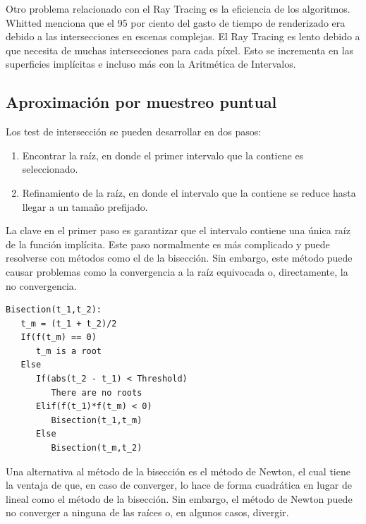 Otro problema relacionado con el Ray Tracing  es la eficiencia de los algoritmos. Whitted\cite{Whitted80} menciona que el 95 por ciento del gasto de tiempo de renderizado era debido a las intersecciones en escenas complejas. El Ray Tracing es lento debido a que necesita de muchas intersecciones para cada píxel. Esto se incrementa en las superficies implícitas e incluso más con la Aritmética de Intervalos.

\subsection{Aproximación por muestreo puntual}

Los test de intersección se pueden desarrollar en dos pasos:
\begin{enumerate}
\item Encontrar la raíz, en donde el primer intervalo que la contiene es seleccionado.
\item Refinamiento de la raíz, en donde el intervalo que la contiene se reduce hasta llegar a un tamaño prefijado.
\end{enumerate}

La clave en el primer paso es garantizar que el intervalo contiene una única raíz de la función implícita. Este paso normalmente es más complicado y puede resolverse con métodos como el de la bisección. Sin embargo, este método puede causar problemas como la convergencia a la raíz equivocada o, directamente, la no convergencia.
\begin{verbatim}
Bisection(t_1,t_2):
   t_m = (t_1 + t_2)/2   
   If(f(t_m) == 0)
      t_m is a root
   Else
      If(abs(t_2 - t_1) < Threshold)
         There are no roots
      Elif(f(t_1)*f(t_m) < 0)
         Bisection(t_1,t_m)
      Else
         Bisection(t_m,t_2)
\end{verbatim}

Una alternativa al método de la bisección es el método de Newton, el cual tiene la ventaja de que, en caso de converger, lo hace de forma cuadrática en lugar de lineal como el método de la bisección. Sin embargo, el método de Newton puede no converger a ninguna de las raíces o, en algunos casos, divergir\cite{Hart01}.


